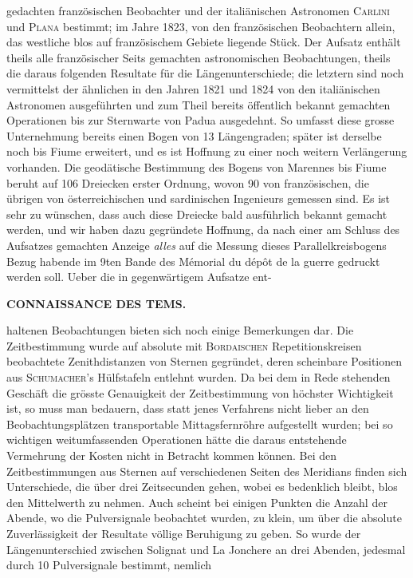 gedachten französischen Beobachter und der italiänischen Astronomen \textsc{Carlini} und \textsc{Plana} bestimmt; im Jahre 1823, von den französischen Beobachtern allein, das westliche blos auf französischem Gebiete liegende Stück. Der Aufsatz enthält theils alle französischer Seits gemachten astronomischen Beobachtungen, theils die daraus folgenden Resultate für die Längenunterschiede; die letztern sind noch vermittelst der ähnlichen in den Jahren 1821 und 1824 von den italiänischen Astronomen ausgeführten und zum Theil bereits öffentlich bekannt gemachten Operationen bis zur Sternwarte von Padua ausgedehnt. So umfasst diese grosse Unternehmung bereits einen Bogen von 13 Längengraden; später ist derselbe noch bis Fiume erweitert, und es ist Hoffnung zu einer noch weitern Verlängerung vorhanden. Die geodätische Bestimmung des Bogens von Marennes bis Fiume beruht auf 106 Dreiecken erster Ordnung, wovon 90 von französischen, die übrigen von österreichischen und sardinischen Ingenieurs gemessen sind. Es ist sehr zu wünschen, dass auch diese Dreiecke bald ausführlich bekannt gemacht werden, und wir haben dazu gegründete Hoffnung, da nach einer am Schluss des Aufsatzes gemachten Anzeige \emph{alles} auf die Messung dieses Parallelkreisbogens Bezug habende im 9ten Bande des Mémorial du dépôt de la guerre gedruckt werden soll. Ueber die in gegenwärtigem Aufsatze ent-
\par\clearpage\thispagestyle{empty}
\fancyhead[L]{}
\noindent\makebox[12mm][l]{\large\bfseries }\parbox[t]{\dimexpr\linewidth-24mm\relax}{\centering\scriptsize\bfseries CONNAISSANCE DES TEMS.}\par\nobreak\medskip\noindent haltenen Beobachtungen bieten sich noch einige Bemerkungen dar. Die Zeitbestimmung wurde auf absolute mit \textsc{Bordaischen} Repetitionskreisen beobachtete Zenithdistanzen von Sternen gegründet, deren scheinbare Positionen aus \textsc{Schumacher}'s Hülfstafeln entlehnt wurden. Da bei dem in Rede stehenden Geschäft die grösste Genauigkeit der Zeitbestimmung von höchster Wichtigkeit ist, so muss man bedauern, dass statt jenes Verfahrens nicht lieber an den Beobachtungsplätzen transportable Mittagsfernröhre aufgestellt wurden; bei so wichtigen weitumfassenden Operationen hätte die daraus entstehende Vermehrung der Kosten nicht in Betracht kommen können. Bei den Zeitbestimmungen aus Sternen auf verschiedenen Seiten des Meridians finden sich Unterschiede, die über drei Zeitsecunden gehen, wobei es bedenklich bleibt, blos den Mittelwerth zu nehmen. Auch scheint bei einigen Punkten die Anzahl der Abende, wo die Pulversignale beobachtet wurden, zu klein, um über die absolute Zuverlässigkeit der Resultate völlige Beruhigung zu geben. So wurde der Längenunterschied zwischen Solignat und La Jonchere an drei Abenden, jedesmal durch 10 Pulversignale bestimmt, nemlich 

